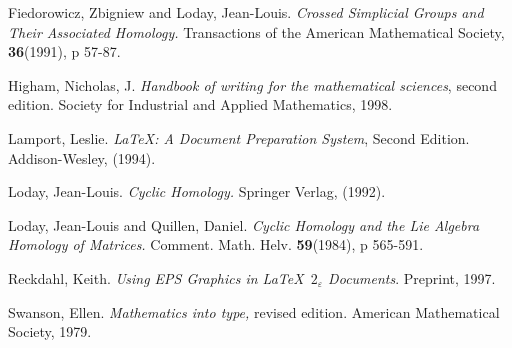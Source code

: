\begin{thebibliography}{99}

 Fiedorowicz, Zbigniew  and Loday, Jean-Louis.
{\em Crossed Simplicial Groups and Their Associated Homology.}
Transactions of the American Mathematical Society, {\bf 36}(1991), p 57-87.

Higham, Nicholas, J.  
{\em Handbook of writing for the mathematical sciences}, second edition.
Society for Industrial and Applied Mathematics, 1998.

 Lamport, Leslie.
{\em LaTeX:  A Document Preparation System}, Second Edition.
Addison-Wesley, (1994).

Loday, Jean-Louis.
{\em Cyclic Homology.}
Springer Verlag, (1992).

 Loday, Jean-Louis and Quillen, Daniel.
{\em Cyclic Homology and the Lie Algebra Homology of Matrices.}
Comment. Math. Helv. {\bf 59}(1984), p 565-591.

  Reckdahl, Keith.
{\em Using EPS Graphics in \LaTeX\ $2_{\varepsilon}$ Documents}.
Preprint, 1997.
 
  Swanson, Ellen.
{\em Mathematics into type,} revised edition.
American Mathematical Society, 1979.

\end{thebibliography}














